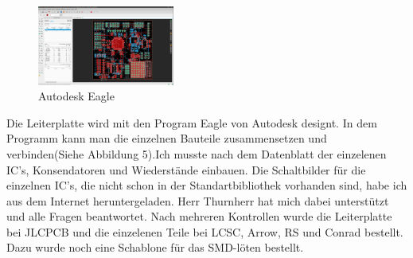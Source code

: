 \documentclass[12pt,a4paper, ngerman]{article}
\begin{document}
\begin{figure}
\centering
\includegraphics[width=0.4\textwidth]{egl.png}
\caption[Screenshot Eagle FC brd file]{Autodesk Eagle}
\end{figure}
Die Leiterplatte wird mit den Program Eagle von Autodesk designt. In dem Programm kann man die einzelnen Bauteile zusammensetzen und verbinden(Siehe Abbildung 5).Ich musste nach dem Datenblatt der einzelenen IC's, Konsendatoren und Wiederstände einbauen. Die Schaltbilder für die einzelnen IC's, die nicht schon in der Standartbibliothek vorhanden sind, habe ich aus dem Internet heruntergeladen. Herr Thurnherr hat mich dabei unterstützt und alle Fragen beantwortet. Nach mehreren Kontrollen wurde die Leiterplatte bei JLCPCB und die einzelenen Teile bei LCSC, Arrow, RS und Conrad bestellt. Dazu wurde noch eine Schablone für das SMD-löten bestellt. 
\end{document}
